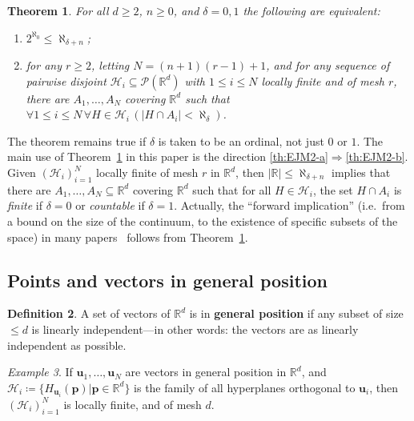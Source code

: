 \documentclass[12pt]{amsart}
\newcommand{\FORALL}[1]{\forall {#1} \, }
\newcommand{\R}{\mathbb{R}}	%
\newcommand{\Pow}{\mathscr{P}}		%
\newcommand{\IMPLIES}{\Rightarrow }
\newcommand{\markdef}[1]{\textbf{#1}} %
\newcommand{\Mid}{\boldsymbol\mid}			%
\newcommand{\setof}[2]{\mathopen \{{#1}\Mid{#2} \mathclose\}} %
\newcommand{\card}[1]{\mathopen | #1 \mathclose |}		%
\theoremstyle{plain}
\newtheorem{theorem}{Theorem}[section]
\theoremstyle{definition}
\newtheorem{definition}[theorem]{Definition}
\theoremstyle{remark}
\newtheorem{example}[theorem]{Example}
\begin{document}
\begin{theorem}\label{th:EJM2}
For all \( d \geq 2 \), \( n \geq 0 \), and \( \delta = 0 , 1 \) the following are equivalent:
\begin{enumerate}[label={\upshape (\alph*)}]
\item\label{th:EJM2-a}
\( 2^{\aleph_0} \leq \aleph_{ \delta + n } \);
\item\label{th:EJM2-b}
for any \( r \geq 2 \), letting \( N = ( n + 1 ) ( r - 1 ) + 1 \), and for any sequence of pairwise disjoint \( \mathcal{H}_i \subseteq \Pow ( \R^d ) \) with \( 1 \leq i \leq N \) locally finite and of mesh \( r \), there are \( A_1 , \dots , A_N \) covering \( \R^d \) such that \( \FORALL{1 \leq i \leq N} \FORALL{ H \in \mathcal{H}_i } ( \card{ H \cap A_i } < \aleph_{ \delta} ) \).
\end{enumerate}
\end{theorem}

The theorem remains true if \( \delta \) is taken to be an ordinal, not just \( 0 \) or \( 1 \).
The main use of Theorem~\ref{th:EJM2} in this paper is the direction \ref{th:EJM2-a}\( \IMPLIES \)\ref{th:EJM2-b}.
Given \( ( \mathcal{H}_i )_{ i = 1 }^N \) locally finite of mesh \( r \) in \( \R^d \), then \( \card{\R} \leq \aleph_{ \delta + n } \) implies that there are \( A_1 , \dots , A_N \subseteq \R^d \) covering \( \R^d \) such that for all \( H \in \mathcal{H}_i \), the set \( H \cap A_i \) is \emph{finite} if \( \delta = 0 \) or \emph{countable} if \( \delta = 1 \).
Actually, the ``forward implication'' (i.e.~from a bound on the size of the continuum, to the existence of specific subsets of the space) in many papers~\cite{Bagemihl:1959te,Davies:1962ly,Davies:1963yu,Davies:1963zr,Bagemihl:1968up,Komjath:2001kq} follows from Theorem~\ref{th:EJM2}.

\subsection{Points and vectors in general position}

\begin{definition}\label{def:well-spread}
A set of vectors of \( \R^d \) is in \markdef{general position} if any subset of size \( \leq d \) is linearly independent---in other words: the vectors are as linearly independent as possible. \end{definition}

\begin{example}\label{xmp:well-spread}
If \( \mathbf{u}_1 , \dots , \mathbf{u}_N \) are vectors in general position in \( \R^d \), and \( \mathcal{H}_i \coloneqq \setof{ H_{ \mathbf{u}_i } ( \mathbf{p} ) }{ \mathbf{p} \in \R^d } \) is the family of all hyperplanes orthogonal to \( \mathbf{u}_i \), then \( ( \mathcal{H}_i )_{ i = 1 }^N \) is locally finite, and of mesh \( d \).
\end{example}
\end{document}
